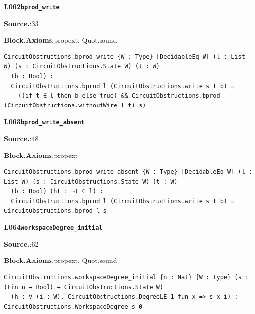 \par\medskip\noindent\begin{minipage}{\textwidth}
{\small\bfseries L062\enspace\texttt{bprod\_write}\par}
{\footnotesize\raggedright\textbf{Source.}\enspace{}:33\par
\textbf{Block.}\quad\textbf{Axioms.}\enspace propext, Quot.sound\par}\nopagebreak
\begin{lstlisting}
CircuitObstructions.bprod_write {W : Type} [DecidableEq W] (l : List W) (s : CircuitObstructions.State W) (t : W)
  (b : Bool) :
  CircuitObstructions.bprod l (CircuitObstructions.write s t b) =
    ((if t ∈ l then b else true) && CircuitObstructions.bprod (CircuitObstructions.withoutWire l t) s)
\end{lstlisting}
\end{minipage}\par

\par\medskip\noindent\begin{minipage}{\textwidth}
{\small\bfseries L063\enspace\texttt{bprod\_write\_absent}\par}
{\footnotesize\raggedright\textbf{Source.}\enspace{}:48\par
\textbf{Block.}\quad\textbf{Axioms.}\enspace propext\par}\nopagebreak
\begin{lstlisting}
CircuitObstructions.bprod_write_absent {W : Type} [DecidableEq W] (l : List W) (s : CircuitObstructions.State W) (t : W)
  (b : Bool) (ht : ¬t ∈ l) :
  CircuitObstructions.bprod l (CircuitObstructions.write s t b) = CircuitObstructions.bprod l s
\end{lstlisting}
\end{minipage}\par

\par\medskip\noindent\begin{minipage}{\textwidth}
{\small\bfseries L064\enspace\texttt{workspaceDegree\_initial}\par}
{\footnotesize\raggedright\textbf{Source.}\enspace{}:62\par
\textbf{Block.}\quad\textbf{Axioms.}\enspace propext, Quot.sound\par}\nopagebreak
\begin{lstlisting}
CircuitObstructions.workspaceDegree_initial {n : Nat} {W : Type} (s : (Fin n → Bool) → CircuitObstructions.State W)
  (h : ∀ (i : W), CircuitObstructions.DegreeLE 1 fun x => s x i) : CircuitObstructions.WorkspaceDegree s 0
\end{lstlisting}
\end{minipage}\par

